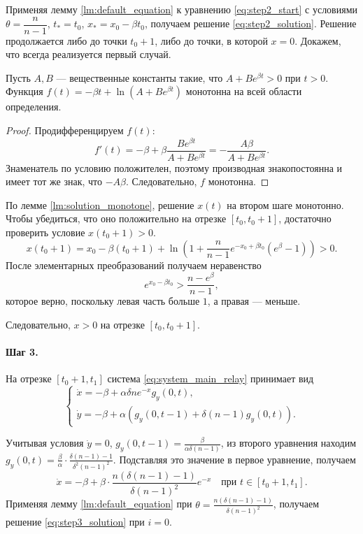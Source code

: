 Применяя лемму \ref{lm:default_equation} к уравнению \eqref{eq:step2_start} с условиями $\theta = \dfrac{n}{n - 1}$, $t_* = t_0$, $x_* = x_0 - \beta t_0$, получаем решение \eqref{eq:step2_solution}. Решение продолжается либо до точки $t_0 + 1$, либо до точки, в которой $x = 0$. Докажем, что всегда реализуется первый случай.

\begin{lemma}
	\label{lm:solution_monotone}
	Пусть $A, B$ --- вещественные константы такие, что $A + B e^{\beta t} > 0$ при $t > 0$. Функция $f(t) = -\beta t + \ln\left(A + B e^{\beta t}\right)$ монотонна на всей области определения.
\end{lemma}
\begin{proof}
	Продифференцируем $f(t)$:
	\[
	f'(t) = -\beta + \beta \dfrac{B e^{\beta t}}{A + B e^{\beta t}} = -\dfrac{A \beta}{A + B e^{\beta t}}.
	\]
	Знаменатель по условию положителен, поэтому производная знакопостоянна и имеет тот же знак, что $-A \beta$. Следовательно, $f$ монотонна.
\end{proof}

По лемме \ref{lm:solution_monotone}, решение $x(t)$ на втором шаге монотонно. Чтобы убедиться, что оно положительно на отрезке $[t_0, t_0 + 1]$, достаточно проверить условие $x(t_0 + 1) > 0$.
%
\[
x(t_0 + 1) = x_0 - \beta (t_0 + 1) + \ln\left(1 + \frac{n}{n - 1}e^{-x_0 + \beta t_0} (e^{\beta} - 1)\right) > 0.
\]
%
После элементарных преобразований получаем неравенство
\[
e^{x_0 - \beta t_0} > \dfrac{n - e^\beta}{n - 1},
\]
которое верно, поскольку левая часть больше $1$, а правая --- меньше.

Следовательно, $x > 0$ на отрезке $[t_0, t_0 + 1]$.

\paragraph{Шаг 3.} На отрезке $[t_0 + 1, t_1]$ система \eqref{eq:system_main_relay} принимает вид
\begin{equation}
	\label{eq:system_step3}
	\begin{cases}
		\dot{x} = -\beta + \alpha \delta n e^{-x} g_y(0, t),\\
		\dot{y} = -\beta + \alpha \left(g_y(0, t - 1) + \delta (n - 1) g_y(0, t)\right).
	\end{cases}
\end{equation}

Учитывая условия $\dot{y} = 0$, $g_y(0, t - 1) = \frac{\beta}{\alpha \delta (n - 1)}$, из второго уравнения находим $g_y(0, t) = \frac{\beta}{\alpha} \cdot \frac{\delta(n - 1) - 1}{\delta^2 (n - 1)^2}$. Подставляя это значение в первое уравнение, получаем
\[
\dot{x} = -\beta + \beta \cdot \dfrac{n (\delta(n - 1) - 1)}{\delta (n - 1)^2} e^{-x} \quad \text{при } t\in[t_0 + 1, t_1].
\]
%
Применяя лемму \ref{lm:default_equation} при $\theta = \frac{n (\delta(n - 1) - 1)}{\delta (n - 1)^2}$, получаем решение \eqref{eq:step3_solution} при $i = 0$.


